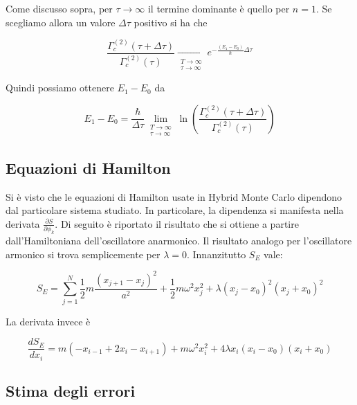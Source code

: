 \documentclass[11pt, a4paper]{article}
\begin{document}
Come discusso sopra, per $\tau \to \infty$ il termine dominante è quello per $n=1$. Se scegliamo allora un valore $\Delta \tau$ positivo si ha che

\begin{equation}
  \frac{\Gamma_c^{(2)}(\tau + \Delta \tau)}{\Gamma_c^{(2)}(\tau)} \xrightarrow[\substack{T \to \infty \\ \tau \to \infty}]{} e^{-\frac{\left(E_1 - E_0\right)}{\hbar}\Delta \tau}
\end{equation}

Quindi possiamo ottenere $E_1 - E_0$ da

\begin{equation}
  \label{creutz}
  E_1 - E_0  = \frac{\hbar}{\Delta \tau} \lim_{\substack{T \to \infty \\ \tau \to \infty}} \ln\left(\frac{\Gamma_c^{(2)}(\tau + \Delta \tau)}{\Gamma_c^{(2)}(\tau)}\right)
\end{equation}

\subsection{Equazioni di Hamilton}

Si è visto che le equazioni di Hamilton usate in Hybrid Monte Carlo dipendono dal particolare sistema studiato. In particolare, la dipendenza si manifesta nella derivata $\frac{\partial S}{\partial \phi_k}$.
Di seguito è riportato il risultato che si ottiene a partire dall'Hamiltoniana dell'oscillatore anarmonico. Il risultato analogo per l'oscillatore armonico si trova semplicemente per $\lambda=0$.
Innanzitutto $S_E$ vale:

\begin{equation}
  S_E = \sum_{j=1}^N \frac{1}{2} m \frac{\left(x_{j+1} - x_{j}\right)^2}{a^2} + \frac{1}{2} m \omega^2 x_j^2 + \lambda \left(x_j - x_0\right)^2 \left(x_j + x_0\right)^2
\end{equation}

La derivata invece è

\begin{equation}
  \frac{dS_E}{dx_i} = m \left(-x_{i-1} + 2 x_i - x_{i+1}\right) + m \omega ^ 2 x_i^2 + 4 \lambda x_i \left(x_i - x_0\right) \left(x_i + x_0\right)
\end{equation}

\subsection{Stima degli errori}
\end{document}
